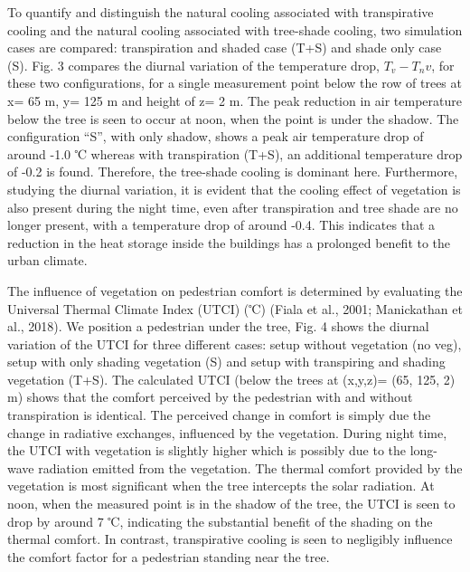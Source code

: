 To quantify and distinguish the natural cooling associated with transpirative cooling and the natural cooling associated with tree-shade cooling, two simulation cases are compared: transpiration and shaded case (T+S) and shade only case (S). Fig. 3 compares the diurnal variation of the temperature drop, $T_v-T_nv$, for these two configurations, for a single measurement point below the row of trees at x= 65 m, y= 125 m and height of z= 2 m. The peak reduction in air temperature below the tree is seen to occur at noon, when the point is under the shadow. The configuration “S”, with only shadow, shows a peak air temperature drop of around -1.0 ℃ whereas with transpiration (T+S), an additional temperature drop of -0.2 is found. Therefore, the tree-shade cooling is dominant here. Furthermore, studying the diurnal variation, it is evident that the cooling effect of vegetation is also present during the night time, even after transpiration and tree shade are no longer present, with a temperature drop of around -0.4. This indicates that a reduction in the heat storage inside the buildings has a prolonged benefit to the urban climate.

The influence of vegetation on pedestrian comfort is determined by evaluating the Universal Thermal Climate Index (UTCI) (℃) (Fiala et al., 2001; Manickathan et al., 2018). We position a pedestrian under the tree, Fig. 4 shows the diurnal variation of the UTCI for three different cases: setup without vegetation (no veg), setup with only shading vegetation (S) and setup with transpiring and shading vegetation (T+S). The calculated UTCI (below the trees at (x,y,z)= (65, 125, 2) m) shows that the comfort perceived by the pedestrian with and without transpiration is identical. The perceived change in comfort is simply due the change in radiative exchanges, influenced by the vegetation. During night time, the UTCI with vegetation is slightly higher which is possibly due to the long-wave radiation emitted from the vegetation. The thermal comfort provided by the vegetation is most significant when the tree intercepts the solar radiation. At noon, when the measured point is in the shadow of the tree, the UTCI is seen to drop by around 7 ℃, indicating the substantial benefit of the shading on the thermal comfort. In contrast, transpirative cooling is seen to negligibly influence the comfort factor for a pedestrian standing near the tree.

